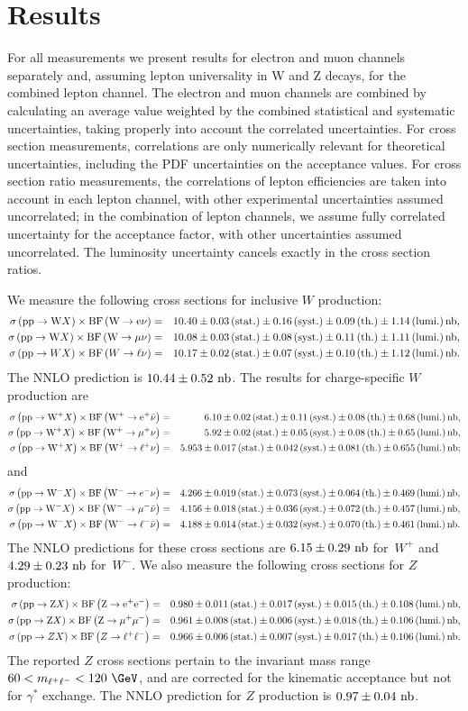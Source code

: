 \section{Results\label{sec:results}}

\par

For all measurements we present results for electron and muon 
channels separately and, assuming lepton universality 
in W and Z decays, for the combined lepton channel. The electron 
and muon channels are combined by calculating an
average value weighted by the combined statistical and systematic uncertainties, 
taking properly into account the correlated
uncertainties.
For cross section measurements, correlations are only numerically 
relevant for theoretical uncertainties, 
including the PDF uncertainties on the acceptance values. For cross 
section ratio measurements, the correlations
 of lepton efficiencies are taken into account in each lepton channel, 
with other experimental uncertainties assumed 
uncorrelated; in the combination of lepton channels, we assume fully 
correlated uncertainty for the acceptance factor, 
with other uncertainties assumed uncorrelated. The luminosity uncertainty 
cancels exactly in the cross section ratios.

We measure the following cross sections for inclusive $W$ production: 
{\footnotesize
\begin{eqnarray*}
 \WEISIGBR , \\ 
 \WMISIGBR , \\ 
 \WLISIGBR . 
\end{eqnarray*}
}
The NNLO prediction is $\THEORYSIGBRWI$.
The results for charge-specific $W$ production are
{\footnotesize
\begin{eqnarray*}
 \WEPSIGBR , \\ 
 \WMPSIGBR , \\ 
 \WLPSIGBR ; 
\end{eqnarray*}
}
and
{\footnotesize
\begin{eqnarray*}
 \WEMSIGBR , \\ 
 \WMMSIGBR , \\ 
 \WLMSIGBR . 
\end{eqnarray*}
}
The NNLO predictions for these cross sections are $\THEORYSIGBRWP$ 
for~$W^+$ and $\THEORYSIGBRWM$ for~$W^-$.  We also measure the 
following cross sections for $Z$ production:
{\footnotesize
\begin{eqnarray*}
 \ZEESIGBR , \\
 \ZMMSIGBR , \\
 \ZLLSIGBR .
\end{eqnarray*}
}
The reported $Z$ cross sections pertain to the
invariant mass range $60 < m_{\ell^+\ell^-} < 120~\GeV$, and 
are corrected for the kinematic acceptance but not for $\gamma^*$ exchange.
The NNLO prediction for $Z$ production is $\THEORYSIGBRZ$. 

